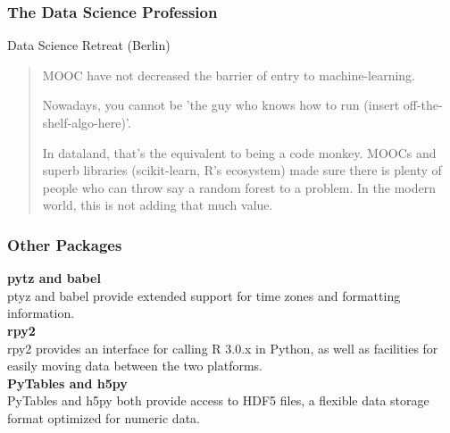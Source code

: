 \documentclass[MASTER.tex]{subfiles}
\begin{document}
 
 \frametitle{The Data Science Profession}
 Data Science Retreat (Berlin)
 \begin{quote}
  MOOC have not  decreased the barrier of entry to machine-learning.
  
  
  Nowadays, you cannot be 'the guy who knows how to run (insert off-the-shelf-algo-here)'. 
  
  
  In dataland, that's the equivalent to being a code monkey. MOOCs and superb libraries (scikit-learn, R's ecosystem) made 
  sure there is plenty of people who can throw say a random forest to a problem. In the modern world, this is not adding that much value. 
 \end{quote}
 
 
\frametitle{Other Packages}
 
\textbf{pytz and babel}\\
ptyz and babel provide extended support for time zones and formatting information.\\ \bigskip
\textbf{rpy2 }\\
rpy2 provides an interface for calling R 3.0.x in Python, as well as facilities for easily moving data between
the two platforms.\\ \bigskip
\textbf{PyTables and h5py }\\
PyTables and h5py both provide access to HDF5 files, a flexible data storage format optimized for numeric
data.
 
\end{document}

